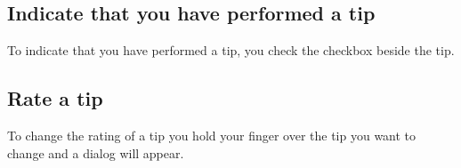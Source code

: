 \subsection{Indicate that you have performed a tip}
To indicate that you have performed a tip, you check the checkbox beside the tip.
\subsection{Rate a tip}
To change the rating of a tip you hold your finger over the tip you want to change and a dialog will appear. 

